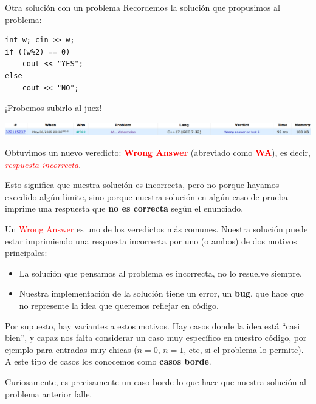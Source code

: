 \documentclass{beamer}
\begin{document}
    \begin{frame}[fragile]{Otra solución con un problema}
        Recordemos la solución que propusimos al problema: \pause

        \begin{verbatim}
int w; cin >> w;
if ((w%2) == 0)
    cout << "YES"; 
else
    cout << "NO"; 
        \end{verbatim}
        \pause

        \begin{center}
            \LARGE
            ¡Probemos subirlo al juez!
        \end{center} \pause

        \begin{center}
            \includegraphics[width=.95\linewidth]{./cf_wa.png}
        \end{center}\pause

        Obtuvimos un nuevo veredicto: \textbf{\textcolor{red}{Wrong Answer}} (abreviado como \textbf{\textcolor{red}{WA}}), es decir, \textit{\textcolor{red}{respuesta incorrecta}}. \pause

        Esto significa que nuestra solución es incorrecta, pero no porque hayamos excedido algún límite, sino porque nuestra solución en algún caso de prueba imprime una respuesta que \textbf{no es correcta} según el enunciado.
    \end{frame}

    \begin{frame}[noframenumbering]
        Un \textcolor{red}{Wrong Answer} es uno de los veredictos más comunes. Nuestra solución puede estar imprimiendo una respuesta incorrecta por uno (o ambos) de dos motivos principales: \pause

        \begin{itemize}
            \item La solución que pensamos al problema es incorrecta, no lo resuelve siempre. \pause

            \item Nuestra implementación de la solución tiene un error, un \textbf{bug}, que hace que no represente la idea que queremos reflejar en código. \pause
        \end{itemize}

        Por supuesto, hay variantes a estos motivos. Hay casos donde la idea está ``casi bien'', y capaz nos falta considerar un caso muy específico en nuestro código, por ejemplo para entradas muy chicas ($n=0$, $n=1$, etc, si el problema lo permite). A este tipo de casos los conocemos como \textbf{casos borde}. \pause

        Curiosamente, es precisamente un caso borde lo que hace que nuestra solución al problema anterior falle.
    \end{frame}
\end{document}

